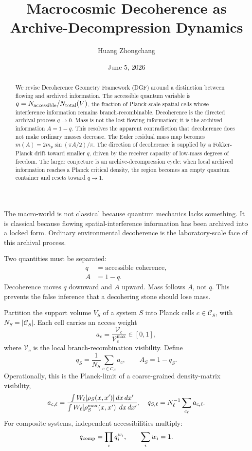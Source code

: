 \documentclass[aps,prl,twocolumn,superscriptaddress,nofootinbib,floatfix]{revtex4-2}
\begin{document}
\title{Macrocosmic Decoherence as Archive-Decompression Dynamics}
\author{Huang Zhongchang}
\date{June 5, 2026}
\begin{abstract}
We revise Decoherence Geometry Framework (DGF) around a distinction between flowing and archived information. The accessible quantum variable is $q=N_{\rm accessible}/N_{\rm total}(V)$, the fraction of Planck-scale spatial cells whose interference information remains branch-recombinable. Decoherence is the directed archival process $q\to0$. Mass is not the lost flowing information; it is the archived information $A=1-q$. This resolves the apparent contradiction that decoherence does not make ordinary masses decrease. The Euler residual mass map becomes $m(A)=2m_p\sin(\pi A/2)/\pi$. The direction of decoherence is supplied by a Fokker-Planck drift toward smaller $q$, driven by the receiver capacity of low-mass degrees of freedom. The larger conjecture is an archive-decompression cycle: when local archived information reaches a Planck critical density, the region becomes an empty quantum container and resets toward $q\to1$.
\end{abstract}
\maketitle

The macro-world is not classical because quantum mechanics lacks something. It is classical because flowing spatial-interference information has been archived into a locked form. Ordinary environmental decoherence is the laboratory-scale face of this archival process.

Two quantities must be separated:
\begin{align}
q&=\text{accessible coherence},\\
A&=1-q.
\end{align}
Decoherence moves $q$ downward and $A$ upward. Mass follows $A$, not $q$. This prevents the false inference that a decohering stone should lose mass.

Partition the support volume $V_S$ of a system $S$ into Planck cells $c\in\mathcal C_S$, with $N_S=|\mathcal C_S|$. Each cell carries an access weight
\begin{equation}
a_c=\frac{\mathcal V_c}{\mathcal V_c^{\max}}\in[0,1],
\end{equation}
where $\mathcal V_c$ is the local branch-recombination visibility. Define
\begin{equation}
\boxed{
q_S=\frac{1}{N_S}\sum_{c\in\mathcal C_S}a_c,
\qquad
A_S=1-q_S.
}
\end{equation}
Operationally, this is the Planck-limit of a coarse-grained density-matrix visibility,
\begin{equation}
a_{c,\ell}=
\frac{\int W_\ell|\rho_S(x,x')|\,dx\,dx'}
{\int W_\ell|\rho_S^{\rm max}(x,x')|\,dx\,dx'},
\quad
q_{S,\ell}=N_\ell^{-1}\sum_{c_\ell}a_{c,\ell}.
\end{equation}
For composite systems, independent accessibilities multiply:
\begin{equation}
q_{\rm comp}=\prod_iq_i^{w_i},
\qquad \sum_iw_i=1.
\end{equation}
\end{document}

